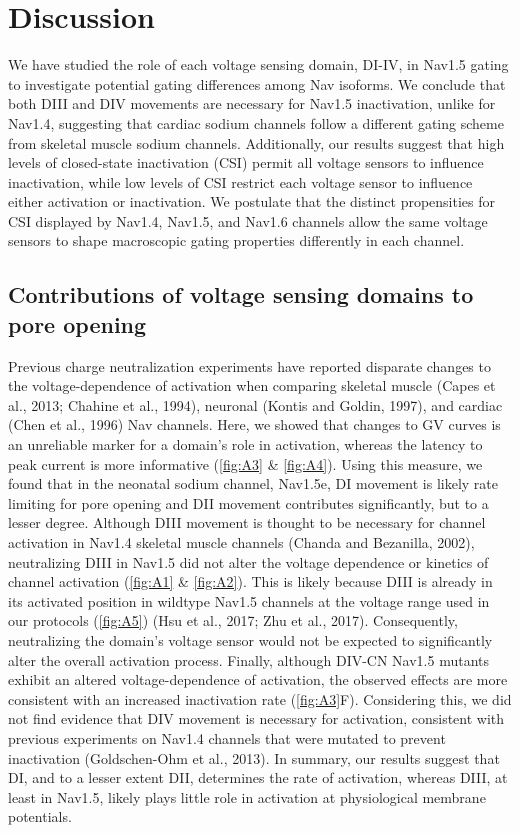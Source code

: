 \section{Discussion}
We have studied the role of each voltage sensing domain, DI-IV, in Nav1.5 gating to investigate potential gating differences among Nav isoforms. We conclude that both DIII and DIV movements are necessary for Nav1.5 inactivation, unlike for Nav1.4, suggesting that cardiac sodium channels follow a different gating scheme from skeletal muscle sodium channels. Additionally, our results suggest that high levels of closed-state inactivation (CSI) permit all voltage sensors to influence inactivation, while low levels of CSI restrict each voltage sensor to influence either activation or inactivation. We postulate that the distinct propensities for CSI displayed by Nav1.4, Nav1.5, and Nav1.6 channels allow the same voltage sensors to shape macroscopic gating properties differently in each channel.

\subsection{Contributions of voltage sensing domains to pore opening}
Previous charge neutralization experiments have reported disparate changes to the voltage-dependence of activation when comparing skeletal muscle (Capes et al., 2013; Chahine et al., 1994), neuronal (Kontis and Goldin, 1997), and cardiac (Chen et al., 1996) Nav channels. Here, we showed that changes to GV curves is an unreliable marker for a domain’s role in activation, whereas the latency to peak current is more informative (\autoref{fig:A3} \& \ref{fig:A4}). Using this measure, we found that in the neonatal sodium channel, Nav1.5e, DI movement is likely rate limiting for pore opening and DII movement contributes significantly, but to a lesser degree. Although DIII movement is thought to be necessary for channel activation in Nav1.4 skeletal muscle channels (Chanda and Bezanilla, 2002), neutralizing DIII in Nav1.5 did not alter the voltage dependence or kinetics of channel activation (\autoref{fig:A1} \& \ref{fig:A2}). This is likely because DIII is already in its activated position in wildtype Nav1.5 channels at the voltage range used in our protocols (\autoref{fig:A5}) (Hsu et al., 2017; Zhu et al., 2017). Consequently, neutralizing the domain’s voltage sensor would not be expected to significantly alter the overall activation process. Finally, although DIV-CN Nav1.5 mutants exhibit an altered voltage-dependence of activation, the observed effects are more consistent with an increased inactivation rate (\autoref{fig:A3}F). Considering this, we did not find evidence that DIV movement is necessary for activation, consistent with previous experiments on Nav1.4 channels that were mutated to prevent inactivation (Goldschen-Ohm et al., 2013). In summary, our results suggest that DI, and to a lesser extent DII, determines the rate of activation, whereas DIII, at least in Nav1.5, likely plays little role in activation at physiological membrane potentials.

